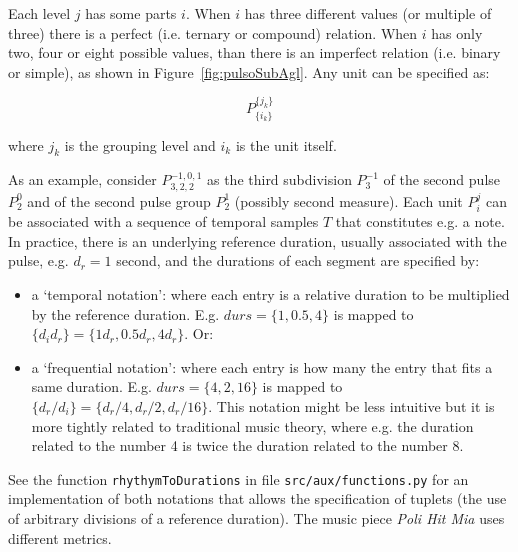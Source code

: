 Each level $j$ has some parts $i$. When $i$ has three different
values (or multiple of three) there is a perfect (i.e. ternary or compound) relation. When $i$ has only
two, four or eight possible values, than there is an imperfect relation (i.e. binary or simple),
as shown in Figure~\ref{fig:pulsoSubAgl}. Any unit can be
specified as:

\begin{equation}\label{eq:rhythmicUnit}
P^{ \{ j_k \} }_{ \{ i_{k} \}}
\end{equation}

\noindent where $j_k$ is the grouping level and $i_k$ is the unit itself.

As an example, consider $P^{-1,0,1}_{3,2,2}$ as the third subdivision $P^{-1}_3$ of the
second pulse $P^0_2$ and of the second pulse group $P^1_2$ (possibly second measure).
Each unit $P_i^j$ can be associated with a sequence of temporal samples $T$ that constitutes e.g. a
note.
In practice, there is an underlying reference duration, usually associated with the pulse,
e.g. $d_r=1$ second, and the durations of each segment are specified by:
\begin{itemize}
	\item a `temporal notation': where each entry is a relative duration to
		be multiplied by the reference duration. E.g. $durs=\{1,0.5,4\}$
		is mapped to $\{d_id_r\} = \{1d_r, 0.5d_r, 4d_r\}$. Or:
	\item a `frequential notation': where each entry is how many the
		entry that fits a same duration. E.g. $durs=\{4, 2, 16\}$
		is mapped to $\{d_r/d_i\} = \{d_r/4, d_r/2, d_r/16\}$.
		This notation might be less intuitive but it is more tightly
		related to traditional music theory, where e.g. the duration related
		to the number 4 is twice the duration related to the number 8.
\end{itemize}
See the function \texttt{rhythymToDurations} in file \texttt{src/aux/functions.py}
for an implementation of both notations that allows the specification of tuplets
(the use of arbitrary divisions of a reference duration).
The music piece \emph{Poli Hit Mia} uses different metrics.~\cite{MASSA}

